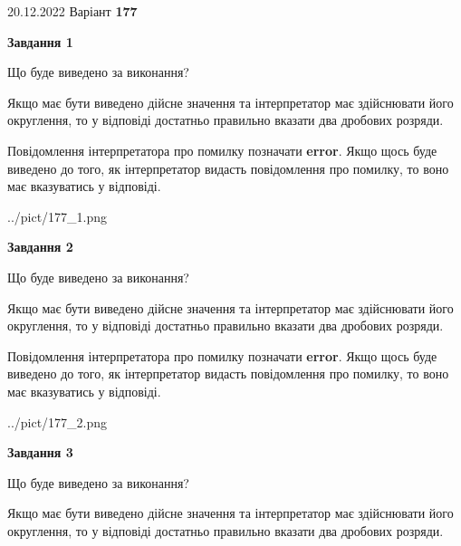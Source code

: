 \documentclass[12pt, ukrainian]{article}
\begin{document}
{20.12.2022 Варіант \No \textbf { 177 }\par}
{
\begin {Large}

{\begin {center}\textbf{Завдання 1}\end {center}}\par
Що буде виведено за виконання? \par

Якщо має бути виведено дійсне значення та інтерпретатор має здійснювати його округлення, 
то у відповіді достатньо правильно вказати два дробових розряди.

Повідомлення інтерпретатора про помилку позначати \textbf{error}.
Якщо щось буде виведено до того, як інтерпретатор видасть повідомлення про помилку, 
то воно має вказуватись у відповіді. \par

\begin{center}
	{../pict/177_1.png}
\end{center}
\newpage

{\begin {center}\textbf{Завдання 2}\end {center}}\par
Що буде виведено за виконання? \par

Якщо має бути виведено дійсне значення та інтерпретатор має здійснювати його округлення, 
то у відповіді достатньо правильно вказати два дробових розряди.

Повідомлення інтерпретатора про помилку позначати \textbf{error}.
Якщо щось буде виведено до того, як інтерпретатор видасть повідомлення про помилку, 
то воно має вказуватись у відповіді. \par

\begin{center}
	{../pict/177_2.png}
\end{center}
\newpage

{\begin {center}\textbf{Завдання 3}\end {center}}\par
Що буде виведено за виконання? \par

Якщо має бути виведено дійсне значення та інтерпретатор має здійснювати його округлення, 
то у відповіді достатньо правильно вказати два дробових розряди.


\end{Large}}
\end{document}
